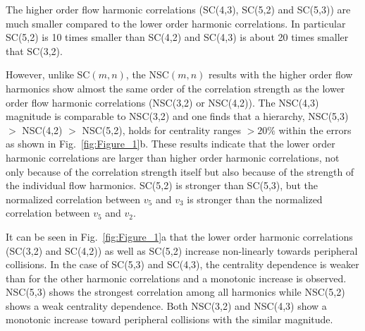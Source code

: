 The higher order flow harmonic correlations (SC(4,3), SC(5,2) and SC(5,3)) are much smaller compared to the lower order harmonic correlations.
In particular SC(5,2) is 10 times smaller than SC(4,2) and SC(4,3) is about 20 times smaller that SC(3,2).

However, unlike SC$(m,n)$, the NSC$(m,n)$ results with the higher order flow harmonics show almost the same order of the correlation strength as the lower order flow harmonic correlations (NSC(3,2) or NSC(4,2)).
The NSC(4,3) magnitude is comparable to NSC(3,2) and one finds that a hierarchy, NSC(5,3) $>$ NSC(4,2) $>$ NSC(5,2), holds for centrality ranges $>20\%$ within the errors as shown in Fig.~\ref{fig:Figure_1}b.
These results indicate that the lower order harmonic correlations are larger than higher order harmonic correlations, not only because of the correlation strength itself but also because of the strength of the individual flow harmonics. 
SC(5,2) is stronger than SC(5,3), but the normalized correlation between $v_5$ and $v_3$ is stronger than the normalized correlation between $v_5$ and $v_2$. 

It can be seen in Fig.~\ref{fig:Figure_1}a that the lower order harmonic correlations (SC(3,2) and SC(4,2)) as well as SC(5,2) increase non-linearly towards peripheral collisions.
In the case of SC(5,3) and SC(4,3), the centrality dependence is weaker than for the other harmonic correlations and a monotonic increase is observed.
NSC(5,3) shows the strongest correlation among all harmonics while NSC(5,2) shows a weak centrality dependence.
Both NSC(3,2) and NSC(4,3) show a monotonic increase toward peripheral collisions with the similar magnitude.

